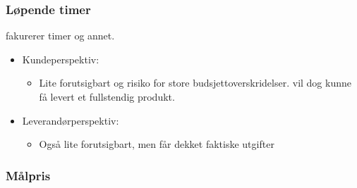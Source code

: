 \documentclass[11pt]{article}
\begin{document}
\subsubsection{Løpende timer}
\label{sec-11.2.2}

    fakurerer timer og annet.  
\begin{itemize}
\item Kundeperspektiv:

\begin{itemize}
\item Lite forutsigbart og risiko for store budsjettoverskridelser.
        vil dog kunne få levert et fullstendig produkt.
\end{itemize}

\item Leverandørperspektiv:

\begin{itemize}
\item Også lite forutsigbart, men får dekket faktiske utgifter
\end{itemize}

\end{itemize}
\subsubsection{Målpris}
\label{sec-11.2.3}
\end{document}

